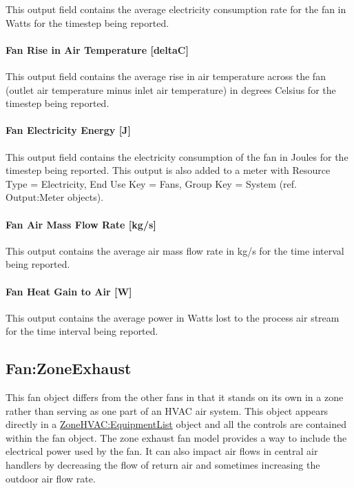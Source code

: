 This output field contains the average electricity consumption rate for the fan in Watts for the timestep being reported.

\paragraph{Fan Rise in Air Temperature {[}deltaC{]}}\label{fan-rise-in-air-temperature-deltac-2}

This output field contains the average rise in air temperature across the fan (outlet air temperature minus inlet air temperature) in degrees Celsius for the timestep being reported.

\paragraph{Fan Electricity Energy {[}J{]}}\label{fan-electric-energy-j-2}

This output field contains the electricity consumption of the fan in Joules for the timestep being reported. This output is also added to a meter with Resource Type = Electricity, End Use Key = Fans, Group Key = System (ref. Output:Meter objects).

\paragraph{Fan Air Mass Flow Rate {[}kg/s{]}}\label{fan-air-mass-flow-kgs-2}

This output contains the average air mass flow rate in kg/s for the time interval being reported.

\paragraph{Fan Heat Gain to Air {[}W{]}}\label{fan-heat-gain-to-air-w-2}

This output contains the average power in Watts lost to the process air stream for the time interval being reported.

\subsection{Fan:ZoneExhaust}\label{fanzoneexhaust}

This fan object differs from the other fans in that it stands on its own in a zone rather than serving as one part of an HVAC air system. This object appears directly in a \hyperref[zonehvacequipmentlist]{ZoneHVAC:EquipmentList} object and all the controls are contained within the fan object. The zone exhaust fan model provides a way to include the electrical power used by the fan. It can also impact air flows in central air handlers by decreasing the flow of return air and sometimes increasing the outdoor air flow rate.

